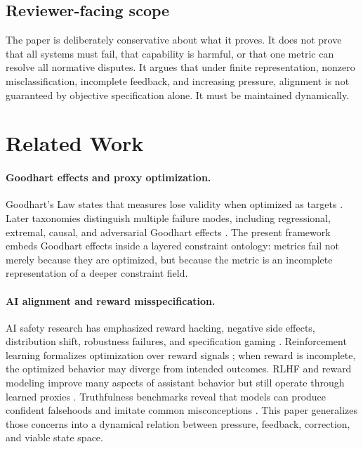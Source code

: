 \documentclass[11pt]{article}
\begin{document}
\subsection{Reviewer-facing scope}

The paper is deliberately conservative about what it proves. It does not prove that all systems must fail, that capability is harmful, or that one metric can resolve all normative disputes. It argues that under finite representation, nonzero misclassification, incomplete feedback, and increasing pressure, alignment is not guaranteed by objective specification alone. It must be maintained dynamically.

\section{Related Work}

\paragraph{Goodhart effects and proxy optimization.} Goodhart's Law states that measures lose validity when optimized as targets \cite{goodhart1975problems}. Later taxonomies distinguish multiple failure modes, including regressional, extremal, causal, and adversarial Goodhart effects \cite{manheim2019categorizing}. The present framework embeds Goodhart effects inside a layered constraint ontology: metrics fail not merely because they are optimized, but because the metric is an incomplete representation of a deeper constraint field.

\paragraph{AI alignment and reward misspecification.} AI safety research has emphasized reward hacking, negative side effects, distribution shift, robustness failures, and specification gaming \cite{amodei2016concrete}. Reinforcement learning formalizes optimization over reward signals \cite{sutton2018reinforcement}; when reward is incomplete, the optimized behavior may diverge from intended outcomes. RLHF and reward modeling improve many aspects of assistant behavior but still operate through learned proxies \cite{leike2018scalable,bai2022training}. Truthfulness benchmarks reveal that models can produce confident falsehoods and imitate common misconceptions \cite{lin2022truthfulqa}. This paper generalizes those concerns into a dynamical relation between pressure, feedback, correction, and viable state space.
\end{document}
